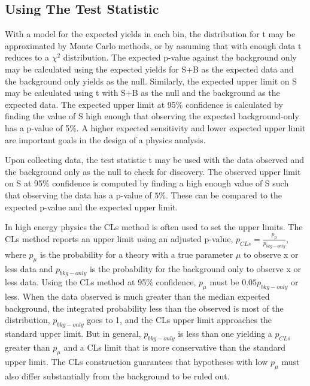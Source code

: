 \documentclass[12pt]{article}
\begin{document}
\subsection{Using The Test Statistic}

With a model for the expected yields in each bin, the distribution for t may be approximated by Monte Carlo methods, or by assuming that with enough data t reduces to a $\chi^2$ distribution. The expected p-value against the background only may be calculated using the expected yields for S+B as the expected data and the background only yields as the null. Similarly, the expected upper limit on S may be calculated using t with S+B as the null and the background as the expected data. The expected upper limit at 95\% confidence is calculated by finding the value of S high enough that observing the expected background-only has a p-value of 5\%. A higher expected sensitivity and lower expected upper limit are important goals in the design of a physics analysis.

Upon collecting data, the test statistic t may be used with the data observed and the background only as the null to check for discovery. The observed upper limit on S at 95\% confidence is computed by finding a high enough value of S such that observing the data has a p-value of $5\%$. These can be compared to the expected p-value and the expected upper limit. 
 
In high energy physics the CLs method is often used to set the upper limits. The CLs method reports an upper limit using an adjusted p-value, $p_{CLs} = \frac{p_\mu}{p_{bkg-only}}$, where $p_{\mu}$ is the probability for a theory with a true parameter $\mu$ to observe x or less data and $p_{bkg-only}$ is the probability for the background only to observe x or less data. Using the CLs method at 95\% confidence, $p_\mu$ must be $0.05p_{bkg-only}$ or less. When the data observed is much greater than the median expected background, the integrated probability less than the observed is most of the distribution, $p_{bkg-only}$ goes to 1, and the CLs upper limit approaches the standard upper limit. But in general, $p_{bkg-only}$ is less than one yielding a $p_{CLs}$ greater than $p_\mu$ and a CLs limit that is more conservative than the standard upper limit. The CLs construction guarantees that hypotheses with low $p_{\mu}$ must also differ substantially from the background to be ruled out.   
\end{document}
